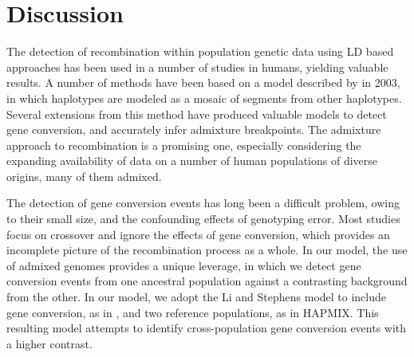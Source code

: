 

\section{Discussion}

The detection of recombination within population genetic data using LD based approaches has been used in a number of studies in humans, yielding valuable results\cite{Mcvean2004,Myers2005,hapmap2007}.
A number of methods have been based on a model described by \citet{Li2003} in 2003, in which haplotypes are modeled as a mosaic of segments from other haplotypes.
Several extensions from this method have produced valuable models to detect gene conversion\cite{Gay2007}, and accurately infer admixture breakpoints\cite{Price2009,Hinch2011}.
The admixture approach to recombination is a promising one, especially considering the expanding availability of data on a number of human populations of diverse origins, many of them admixed.

The detection of gene conversion events has long been a difficult problem, owing to their small size, and the confounding effects of genotyping error.
Most studies focus on crossover and ignore the effects of gene conversion, which provides an incomplete picture of the recombination process as a whole.
In our model, the use of admixed genomes provides a unique leverage, in which we detect gene conversion events from one ancestral population against a contrasting background from the other.
In our model, we adopt the Li and Stephens model to include gene conversion, as in \citet{Gay2007}, and two reference populations, as in HAPMIX\cite{Price2009}.
This resulting model attempts to identify cross-population gene conversion events with a higher contrast.



